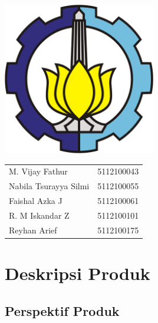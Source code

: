 \documentclass[12pt, a4paper, oneside]{book}
\begin{document}
	\begin{center}
	\end{center}
	\begin{center}
		\includegraphics[width=0.5\textwidth]{lambangits}
		\linebreak
			\begin{table}[h]
				\centering
				\begin{tabular}{lr}
					M. Vijay Fathur       & 5112100043 \\
					Nabila Tsurayya Silmi & 5112100055 \\
					Faishal Azka J        & 5112100061 \\
					R. M Iskandar Z       & 5112100101 \\
					Reyhan Arief          & 5112100175 \\
				\end{tabular}
			\end{table}
		\end{center}
		\begin{center}
		{		
		}
	\end{center}
	
	\thispagestyle{empty}
	\pagebreak
	\tableofcontents
	\pagebreak
	\listoffigures
	\pagebreak
	\chapter{Deskripsi Produk}
	\section{Perspektif Produk}
		
\end{document}
